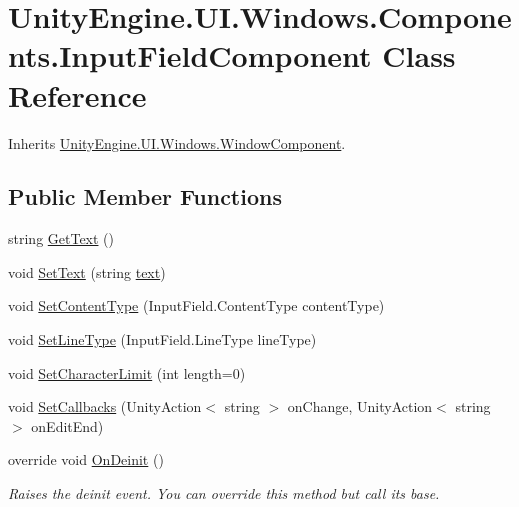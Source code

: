 \hypertarget{class_unity_engine_1_1_u_i_1_1_windows_1_1_components_1_1_input_field_component}{}\section{Unity\+Engine.\+U\+I.\+Windows.\+Components.\+Input\+Field\+Component Class Reference}
\label{class_unity_engine_1_1_u_i_1_1_windows_1_1_components_1_1_input_field_component}


Inherits \hyperlink{class_unity_engine_1_1_u_i_1_1_windows_1_1_window_component}{Unity\+Engine.\+U\+I.\+Windows.\+Window\+Component}.

\subsection*{Public Member Functions}
\begin{DoxyCompactItemize}
\item 
string \hyperlink{class_unity_engine_1_1_u_i_1_1_windows_1_1_components_1_1_input_field_component_ac90e965dc45260361f7ecaae1d58ce71}{Get\+Text} ()
\item 
void \hyperlink{class_unity_engine_1_1_u_i_1_1_windows_1_1_components_1_1_input_field_component_a5d13b1fdf81506ac8daa6aa80ae7eca7}{Set\+Text} (string \hyperlink{class_unity_engine_1_1_u_i_1_1_windows_1_1_components_1_1_input_field_component_a44ad94e89aa512f332900e24c91f23d4}{text})
\item 
void \hyperlink{class_unity_engine_1_1_u_i_1_1_windows_1_1_components_1_1_input_field_component_a7a578909875f98b8fa156b668cefc70d}{Set\+Content\+Type} (Input\+Field.\+Content\+Type content\+Type)
\item 
void \hyperlink{class_unity_engine_1_1_u_i_1_1_windows_1_1_components_1_1_input_field_component_a0772cac8d8cd2db640bfa341e3795c9b}{Set\+Line\+Type} (Input\+Field.\+Line\+Type line\+Type)
\item 
void \hyperlink{class_unity_engine_1_1_u_i_1_1_windows_1_1_components_1_1_input_field_component_ae935fc348bd47cad4a08779791fe03a4}{Set\+Character\+Limit} (int length=0)
\item 
void \hyperlink{class_unity_engine_1_1_u_i_1_1_windows_1_1_components_1_1_input_field_component_a570bfcb01f7bf66ff4d9eede9daececb}{Set\+Callbacks} (Unity\+Action$<$ string $>$ on\+Change, Unity\+Action$<$ string $>$ on\+Edit\+End)
\item 
override void \hyperlink{class_unity_engine_1_1_u_i_1_1_windows_1_1_components_1_1_input_field_component_a003d6f467f3211b3b55e03ad488f9a40}{On\+Deinit} ()
\begin{DoxyCompactList}\small\item\em Raises the deinit event. You can override this method but call it\textquotesingle{}s base. \end{DoxyCompactList}\end{DoxyCompactItemize}

